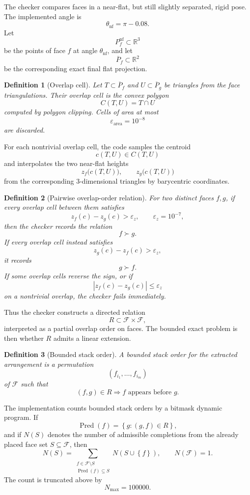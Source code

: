 \documentclass[11pt]{article}
\newtheorem{definition}{Definition}[section]
\theoremstyle{remark}
\newcommand{\RR}{\mathbb{R}}
\newcommand{\eps}{\varepsilon}
\newcommand{\abs}[1]{\left\lvert #1 \right\rvert}
\newcommand{\set}[1]{\left\{ #1 \right\}}
\begin{document}
The checker compares faces in a near-flat, but still slightly separated, rigid
pose. The implemented angle is
\[
\theta_{\mathrm{nf}}=\pi-0.08.
\]
Let
\[
P_f^{\mathrm{nf}}\subset\RR^3
\]
be the points of face $f$ at angle $\theta_{\mathrm{nf}}$, and let
\[
\overline P_f\subset\RR^2
\]
be the corresponding exact final flat projection.

\begin{definition}[Overlap cell]
Let $T\subset \overline P_f$ and $U\subset \overline P_g$ be triangles from the
face triangulations. Their \emph{overlap cell} is the convex polygon
\[
C(T,U)=T\cap U
\]
computed by polygon clipping. Cells of area at most
\[
\eps_{\mathrm{area}}=10^{-8}
\]
are discarded.
\end{definition}

For each nontrivial overlap cell, the code samples the centroid
\[
c(T,U)\in C(T,U)
\]
and interpolates the two near-flat heights
\[
z_f\bigl(c(T,U)\bigr),
\qquad
z_g\bigl(c(T,U)\bigr)
\]
from the corresponding 3-dimensional triangles by barycentric coordinates.

\begin{definition}[Pairwise overlap-order relation]
For two distinct faces $f,g$, if every overlap cell between them satisfies
\[
z_f(c)-z_g(c)>\eps_z,
\qquad
\eps_z=10^{-7},
\]
then the checker records the relation
\[
f\succ g.
\]
If every overlap cell instead satisfies
\[
z_g(c)-z_f(c)>\eps_z,
\]
it records
\[
g\succ f.
\]
If some overlap cells reverse the sign, or if
\[
\abs{z_f(c)-z_g(c)}\le \eps_z
\]
on a nontrivial overlap, the checker fails immediately.
\end{definition}

Thus the checker constructs a directed relation
\[
R\subset \mathcal F\times\mathcal F,
\]
interpreted as a partial overlap order on faces. The bounded exact problem is
then whether $R$ admits a linear extension.

\begin{definition}[Bounded stack order]
A \emph{bounded stack order} for the extracted arrangement is a permutation
\[
(f_{i_1},\dots,f_{i_m})
\]
of $\mathcal F$ such that
\[
(f,g)\in R
\Longrightarrow
f \text{ appears before } g.
\]
\end{definition}

The implementation counts bounded stack orders by a bitmask dynamic program. If
\[
\operatorname{Pred}(f)=\set{g:(g,f)\in R},
\]
and if $N(S)$ denotes the number of admissible completions from the already
placed face set $S\subseteq\mathcal F$, then
\[
N(S)=
\sum_{\substack{f\in \mathcal F\setminus S\\ \operatorname{Pred}(f)\subseteq S}}
N(S\cup\set{f}),
\qquad
N(\mathcal F)=1.
\]
The count is truncated above by
\[
N_{\max}=100000.
\]
\end{document}
